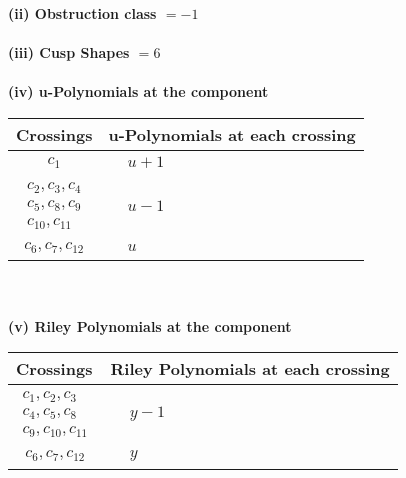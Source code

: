 \documentclass[1p]{elsarticle_modified}
\theoremstyle{definition}
\begin{document}
\flushleft \textbf{(ii) Obstruction class $= -1$}\\~\\
\flushleft \textbf{(iii) Cusp Shapes $= 6$}\\~\\
\newpage\renewcommand{\arraystretch}{1}
\flushleft \textbf{(iv) u-Polynomials at the component}\newline \\
\begin{tabular}{m{50pt}|m{274pt}}
Crossings & \hspace{64pt}u-Polynomials at each crossing \\
\hline $$\begin{aligned}c_{1}\end{aligned}$$&$\begin{aligned}
&u+1
\end{aligned}$\\
\hline $$\begin{aligned}c_{2},c_{3},c_{4}\\c_{5},c_{8},c_{9}\\c_{10},c_{11}\end{aligned}$$&$\begin{aligned}
&u-1
\end{aligned}$\\
\hline $$\begin{aligned}c_{6},c_{7},c_{12}\end{aligned}$$&$\begin{aligned}
&u
\end{aligned}$\\
\hline
\end{tabular}\\~\\
\newpage\renewcommand{\arraystretch}{1}
\flushleft \textbf{(v) Riley Polynomials at the component}\newline \\
\begin{tabular}{m{50pt}|m{274pt}}
Crossings & \hspace{64pt}Riley Polynomials at each crossing \\
\hline $$\begin{aligned}c_{1},c_{2},c_{3}\\c_{4},c_{5},c_{8}\\c_{9},c_{10},c_{11}\end{aligned}$$&$\begin{aligned}
&y-1
\end{aligned}$\\
\hline $$\begin{aligned}c_{6},c_{7},c_{12}\end{aligned}$$&$\begin{aligned}
&y
\end{aligned}$\\
\hline
\end{tabular}\\~\\
\end{document}
